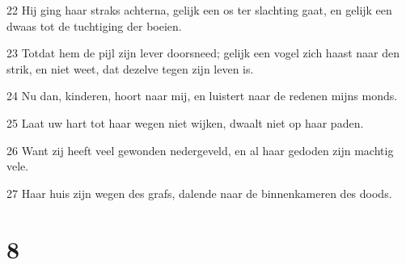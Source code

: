 \par 22 Hij ging haar straks achterna, gelijk een os ter slachting gaat, en gelijk een dwaas tot de tuchtiging der boeien.
\par 23 Totdat hem de pijl zijn lever doorsneed; gelijk een vogel zich haast naar den strik, en niet weet, dat dezelve tegen zijn leven is.
\par 24 Nu dan, kinderen, hoort naar mij, en luistert naar de redenen mijns monds.
\par 25 Laat uw hart tot haar wegen niet wijken, dwaalt niet op haar paden.
\par 26 Want zij heeft veel gewonden nedergeveld, en al haar gedoden zijn machtig vele.
\par 27 Haar huis zijn wegen des grafs, dalende naar de binnenkameren des doods.

\chapter{8}


